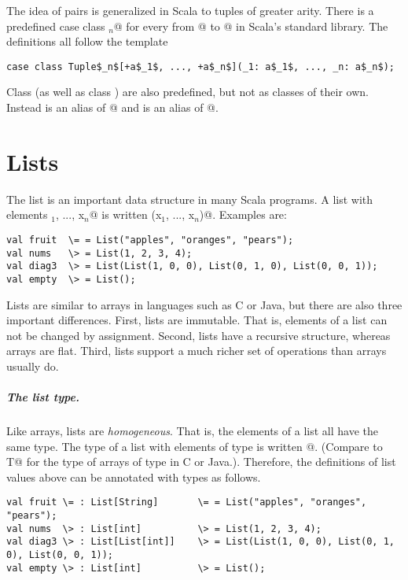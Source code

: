 \documentclass[11pt]{book}
\begin{document}
The idea of pairs is generalized in Scala to tuples of greater arity.
There is a predefined case class \verb@Tuple$_n$@ for every \verb@n@
from @ to @ in Scala's standard library. The
definitions all follow the template
\begin{verbatim}
case class Tuple$_n$[+a$_1$, ..., +a$_n$](_1: a$_1$, ..., _n: a$_n$);
\end{verbatim}
Class \verb@Pair@ (as well as class \verb@Triple@) are also
predefined, but not as classes of their own. Instead 
\verb@Pair@ is an alias of @ and \verb@Triple@ is an
alias of @. 

\chapter{Lists}

The list is an important data structure in many Scala programs.  
A list with elements \verb@x$_1$, ..., x$_n$@ is written
\verb@List(x$_1$, ..., x$_n$)@. Examples are:
\begin{verbatim}
val fruit  \= = List("apples", "oranges", "pears");
val nums   \> = List(1, 2, 3, 4);
val diag3  \> = List(List(1, 0, 0), List(0, 1, 0), List(0, 0, 1));
val empty  \> = List();
\end{verbatim}
Lists are similar to arrays in languages such as C or Java, but there
are also three important differences. First, lists are immutable. That
is, elements of a list can not be changed by assignment. Second, 
lists have a recursive structure, whereas arrays are flat. Third,
lists support a much richer set of operations than arrays usually do.

\paragraph{The list type.}
Like arrays, lists are {\em homogeneous}. That is, the elements of a
list all have the same type.  The type of a list with elements of type
\verb@T@ is written \verb@List[T]@. (Compare to \verb@[]T@ for the
type of arrays of type \verb@T@ in C or Java.). Therefore, the 
definitions of list values above can be annotated with types as
follows.
\begin{verbatim}
val fruit \= : List[String]       \= = List("apples", "oranges", "pears");
val nums  \> : List[int]          \> = List(1, 2, 3, 4);
val diag3 \> : List[List[int]]    \> = List(List(1, 0, 0), List(0, 1, 0), List(0, 0, 1));
val empty \> : List[int]          \> = List();
\end{verbatim}
\end{document}
